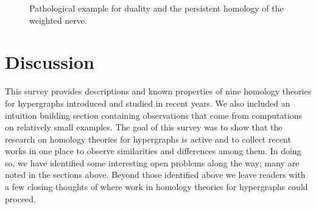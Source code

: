 \documentclass{amsart}
\renewcommand{\H}{\mathcal{H}}
\newcommand{\Nrv}{\mm{\mathrm{Nrv}}}
\newcommand {\mm}[1]        {\ifmmode{#1}\else{\mbox{\(#1\)}}\fi}
\begin{document}
\begin{figure}[h!]





 \caption{Pathological example for duality and the persistent homology of the weighted nerve.}
    \label{fig:pathological_wtd_nrv}
\end{figure}





\section{Discussion}
\label{sec:discussion}

This survey provides descriptions and known properties of nine homology theories for hypergraphs introduced and studied in recent years. We also included an intuition building section containing observations that come  from computations on relatively small examples. 
The goal of this survey was to show that the research on homology theories for hypergraphs is active and to collect recent works in one place to observe similarities and differences among them.
In doing so, we have identified  some interesting open problems along the way; many are noted in the sections above.
Beyond those identified above we leave readers with a few closing thoughts of where work in homology theories for hypergraphs could proceed.
\end{document}
